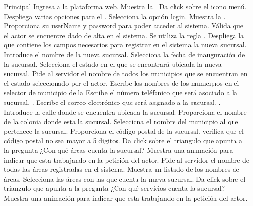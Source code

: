 	\begin{UCtrayectoria}{Principal}
		\UCpaso[\UCactor] Ingresa a la plataforma web. 
		\UCpaso Muestra la .
		\UCpaso[\UCactor] Da click sobre el icono menú.
		\UCpaso Despliega varias opciones para el \UCactor.
		\UCpaso[\UCactor] Selecciona la opción login.
		\UCpaso Muestra la  \label{CU11Login}.
		\UCpaso[\UCactor] Proporciona su userName y password para poder acceder al sistema.
		\UCpaso Válida que el actor se encuentre dado de alta en el sistema. Se utiliza la regla  . %
		\UCpaso Despliega la  que contiene los campos necesarios para registrar en el sistema la nueva sucursal.
		\UCpaso[\UCactor] Introduce el nombre de la nueva sucursal.
		\UCpaso[\UCactor] Selecciona la fecha de inauguración de la sucursal.
		\UCpaso[\UCactor] Selecciona el estado en el que se encontrará ubicada la nueva sucursal.
		\UCpaso Pide al servidor el nombre de todos los municipios que se encuentran en el estado seleccionado por el actor.
		\UCpaso Escribe los nombres de los municipios en el selector de municipio de la 
		\UCpaso[\UCactor] Escribe el número teléfonico que será asociado a la sucursal. \label{CU11AgregarTelefono}.
		\UCpaso[\UCactor] Escribe el correo electrónico que será asignado a la sucursal. \label{CU11AgregarMail}.
		\UCpaso[\UCactor] Introduce la calle donde se encuentra ubicada la sucursal.
		\UCpaso[\UCactor] Proporciona el nombre de la colonia donde esta la sucursal.
		\UCpaso[\UCactor] Selecciona el nombre del municipio al que pertenece la sucursal.
		\UCpaso[\UCactor] Proporciona el código postal de la sucursal.
		\UCpaso verifica que el código postal no sea mayor a 5 digitos.
		\UCpaso[\UCactor] Da click sobre el triangulo que apunta a la pregunta ¿Con qué áreas cuenta la sucursal?
		\UCpaso Muestra una animación para indicar que esta trabajando en la petición del actor.
		\UCpaso Pide al servidor el nombre de todas las áreas registradas en el sistema. \label{CU11ProblemAreas}
		\UCpaso	Muestra un listado de los nombres de áreas.
		\UCpaso[\UCactor] Selecciona las áreas con las que cuenta la nueva sucursal.
		\UCpaso[\UCactor] Da click sobre el triangulo que apunta a la pregunta ¿Con qué servicios cuenta la sucursal?
		\UCpaso Muestra una animación para indicar que esta trabajando en la petición del actor.

\end{UCtrayectoria}
